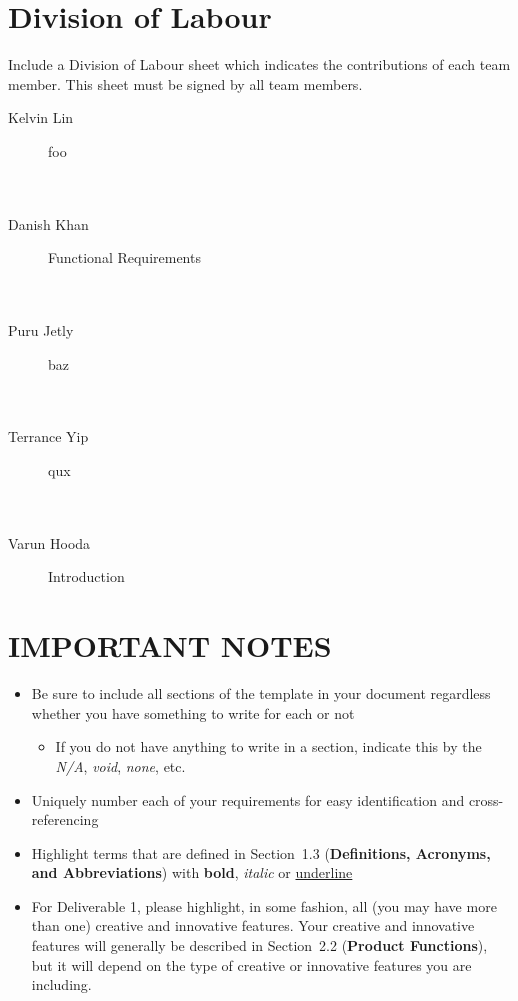 \documentclass[]{article}
\begin{document}


\newpage

\appendix
\section{Division of Labour}
\label{sec:division_of_labour}
Include a Division of Labour sheet which indicates the contributions of each
team member. This sheet must be signed by all team members.
\begin{description}
  \item [Kelvin Lin] foo
    \\\\\\

  \item [Danish Khan] Functional Requirements
    \\\\\\

  \item [Puru Jetly] baz
    \\\\\\

  \item [Terrance Yip] qux
    \\\\\\

  \item [Varun Hooda] Introduction
\end{description}


\newpage
\section*{IMPORTANT NOTES}
\begin{itemize}
	\item Be sure to include all sections of the template in your document
regardless whether you have something to write for each or not
	\begin{itemize}
		\item If you do not have anything to write in a section, indicate this by the
\emph{N/A}, \emph{void}, \emph{none}, etc.
	\end{itemize}
	\item Uniquely number each of your requirements for easy identification and
cross-referencing
	\item Highlight terms that are defined in Section~1.3 (\textbf{Definitions,
Acronyms, and Abbreviations}) with \textbf{bold}, \emph{italic} or
\underline{underline}
	\item For Deliverable 1, please highlight, in some fashion, all (you may have
more than one) creative and innovative features. Your creative and innovative
features will generally be described in Section~2.2 (\textbf{Product
Functions}), but it will depend on the type of creative or innovative features
you are including.
\end{itemize}
\end{document}
